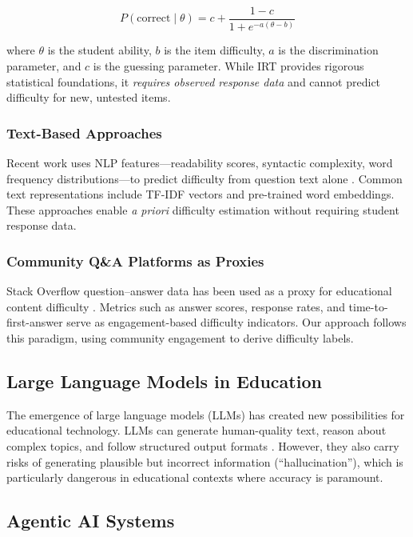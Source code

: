 \documentclass[12pt, a4paper]{article}
\begin{document}
\begin{equation}
    P(\text{correct} \mid \theta) = c + \frac{1 - c}{1 + e^{-a(\theta - b)}}
    \label{eq:irt}
\end{equation}

where $\theta$ is the student ability, $b$ is the item difficulty, $a$ is the discrimination parameter, and $c$ is the guessing parameter. While IRT provides rigorous statistical foundations, it \emph{requires observed response data} and cannot predict difficulty for new, untested items.

\subsubsection{Text-Based Approaches}
Recent work uses NLP features---readability scores, syntactic complexity, word frequency distributions---to predict difficulty from question text alone \citep{ha2019automated}. Common text representations include TF-IDF vectors and pre-trained word embeddings. These approaches enable \emph{a priori} difficulty estimation without requiring student response data.

\subsubsection{Community Q\&A Platforms as Proxies}
Stack Overflow question--answer data has been used as a proxy for educational content difficulty \citep{anderson2012discovering}. Metrics such as answer scores, response rates, and time-to-first-answer serve as engagement-based difficulty indicators. Our approach follows this paradigm, using community engagement to derive difficulty labels.

\subsection{Large Language Models in Education}

The emergence of large language models (LLMs) has created new possibilities for educational technology. LLMs can generate human-quality text, reason about complex topics, and follow structured output formats \citep{brown2020language}. However, they also carry risks of generating plausible but incorrect information (``hallucination''), which is particularly dangerous in educational contexts where accuracy is paramount.

\subsection{Agentic AI Systems}
\end{document}
